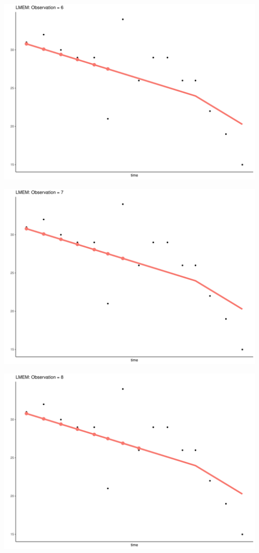 \documentclass[
  ignorenonframetext,
]{beamer}
\begin{document}
\begin{frame}{}
\protect\hypertarget{section-5}{}
\includegraphics{Prez4_files/figure-beamer/unnamed-chunk-13-6.pdf}
\end{frame}

\begin{frame}{}
\protect\hypertarget{section-6}{}
\includegraphics{Prez4_files/figure-beamer/unnamed-chunk-13-7.pdf}
\end{frame}

\begin{frame}{}
\protect\hypertarget{section-7}{}
\includegraphics{Prez4_files/figure-beamer/unnamed-chunk-13-8.pdf}
\end{frame}
\end{document}
